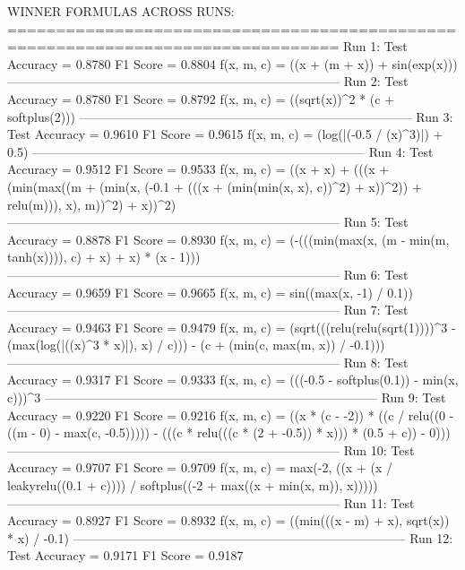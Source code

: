 WINNER FORMULAS ACROSS RUNS:
================================================================================
Run 1:
   Test Accuracy = 0.8780
   F1 Score      = 0.8804
   f(x, m, c)    = ((x + (m + x)) + sin(exp(x)))
--------------------------------------------------------------------------------
Run 2:
   Test Accuracy = 0.8780
   F1 Score      = 0.8792
   f(x, m, c)    = ((sqrt(x))^2 * (c + softplus(2)))
--------------------------------------------------------------------------------
Run 3:
   Test Accuracy = 0.9610
   F1 Score      = 0.9615
   f(x, m, c)    = (log(|(-0.5 / (x)^3)|) + 0.5)
--------------------------------------------------------------------------------
Run 4:
   Test Accuracy = 0.9512
   F1 Score      = 0.9533
   f(x, m, c)    = ((x + x) + (((x + (min(max((m + (min(x, (-0.1 + (((x + (min(min(x, x), c))^2) + x))^2)) + relu(m))), x), m))^2) + x))^2)
--------------------------------------------------------------------------------
Run 5:
   Test Accuracy = 0.8878
   F1 Score      = 0.8930
   f(x, m, c)    = (-(((min(max(x, (m - min(m, tanh(x)))), c) + x) + x) * (x - 1)))
--------------------------------------------------------------------------------
Run 6:
   Test Accuracy = 0.9659
   F1 Score      = 0.9665
   f(x, m, c)    = sin((max(x, -1) / 0.1))
--------------------------------------------------------------------------------
Run 7:
   Test Accuracy = 0.9463
   F1 Score      = 0.9479
   f(x, m, c)    = (sqrt(((relu(relu(sqrt(1))))^3 - (max(log(|((x)^3 * x)|), x) / c))) - (c + (min(c, max(m, x)) / -0.1)))
--------------------------------------------------------------------------------
Run 8:
   Test Accuracy = 0.9317
   F1 Score      = 0.9333
   f(x, m, c)    = (((-0.5 - softplus(0.1)) - min(x, c)))^3
--------------------------------------------------------------------------------
Run 9:
   Test Accuracy = 0.9220
   F1 Score      = 0.9216
   f(x, m, c)    = ((x * (c - -2)) * ((c / relu((0 - ((m - 0) - max(c, -0.5))))) - (((c * relu(((c * (2 + -0.5)) * x))) * (0.5 + c)) - 0)))
--------------------------------------------------------------------------------
Run 10:
   Test Accuracy = 0.9707
   F1 Score      = 0.9709
   f(x, m, c)    = max(-2, ((x + (x / leakyrelu((0.1 + c)))) / softplus((-2 + max((x + min(x, m)), x)))))
--------------------------------------------------------------------------------
Run 11:
   Test Accuracy = 0.8927
   F1 Score      = 0.8932
   f(x, m, c)    = ((min(((x - m) + x), sqrt(x)) * x) / -0.1)
--------------------------------------------------------------------------------
Run 12:
   Test Accuracy = 0.9171
   F1 Score      = 0.9187

